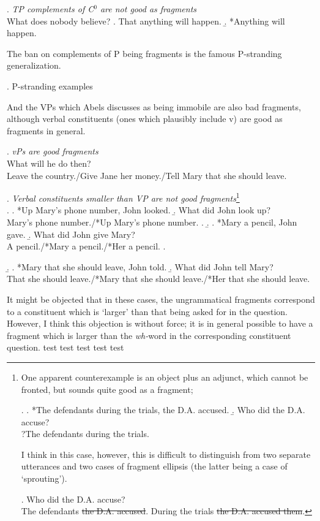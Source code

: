 \documentclass[11pt,letterpaper]{article}
\begin{document}
 \ex. 	{\it TP complements of C$^0$ are not good as fragments}\\
 	What does nobody believe?
 	\a. That anything will happen.
 	\b. *Anything will happen.
 	
 The ban on complements of P being fragments is the famous P-stranding generalization.
 
 \ex. 	P-stranding examples %
 
 And the VPs which Abels discusses as being immobile are also bad fragments, although verbal constituents (ones which plausibly include v) are good as fragments in general.
 
 \ex. 	{\it vPs are good fragments}\\
 	What will he do then?\\
 	Leave the country./Give Jane her money./Tell Mary that she should leave.
 	
 \ex. 	{\it Verbal constituents smaller than VP are not good fragments}\footnote{One apparent counterexample is an object plus an adjunct, which cannot be fronted, but sounds quite good as a fragment;
 
 \ex.	\a. *The defendants during the trials, the D.A. accused.
 	\b. Who did the D.A. accuse?\\
 		?The defendants during the trials.
 
 I think in this case, however, this is difficult to distinguish from two separate utterances and two cases of fragment ellipsis (the latter being a case of `sprouting').
 
 \ex.	Who did the D.A. accuse?\\
 	The defendants \sout{the D.A. accused}. During the trials \sout{the D.A. accused them}.
 	
 {}
 
 }\\
 	\a. 	\a. *Up Mary's phone number, John looked.
 		\b. What did John look up?\\
 			Mary's phone number./*Up Mary's phone number.
 		\z.
 	\b.	\a. *Mary a pencil, John gave.
 		\b. What did John give Mary?\\
 			A pencil./*Mary a pencil./*Her a pencil.
 		\z.

 	\b. 	\a. *Mary that she should leave, John told.
 		\b. What did John tell Mary?\\
 			That she should leave./*Mary that she should leave./*Her that she should leave.
 
 It might be objected that in these cases, the ungrammatical fragments correspond to a constituent which is `larger' than that being asked for in the question.
 However, I think this objection is without force; it is in general possible to have a fragment which is larger than the {\it wh-}word in the corresponding constituent question.
 test test test test test
 
 
\end{document}
